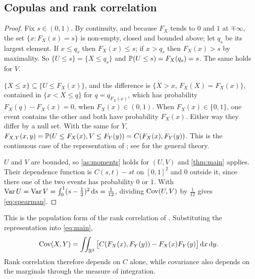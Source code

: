 \documentclass{saim-blog}
\begin{document}
\subsection{Copulas and rank correlation}
\begin{proof}
Fix $s\in(0,1)$. By continuity, and because $F_X$ tends to $0$ and $1$ at $\mp\infty$, the set $\{x:F_X(x)=s\}$ is non-empty, closed and bounded above; let $q_s$ be its largest element. If $x\le q_s$ then $F_X(x)\le s$; if $x>q_s$ then $F_X(x)>s$ by maximality. So $\{U\le s\}=\{X\le q_s\}$ and $\mathbb{P}(U\le s)=F_X(q_s)=s$. The same holds for $V$.

$\{X\le x\}\subseteq\{U\le F_X(x)\}$, and the difference is $\{X>x,\,F_X(X)=F_X(x)\}$, contained in $\{x<X\le q\}$ for $q=q_{F_X(x)}$, which has probability $F_X(q)-F_X(x)=0$, when $F_X(x)\in(0,1)$. When $F_X(x)\in\{0,1\}$, one event contains the other and both have probability $F_X(x)$. Either way they differ by a null set. With the same for $Y$, $F_{X,Y}(x,y)=\mathbb{P}(U\le F_X(x),V\le F_Y(y))=C(F_X(x),F_Y(y))$. This is the continuous case of the representation of \citet{sklar1959}; see \citet{nelsen2006} for the general theory.

$U$ and $V$ are bounded, so \cref{as:moments} holds for $(U,V)$ and \cref{thm:main} applies. Their dependence function is $C(s,t)-st$ on $[0,1]^2$ and $0$ outside it, since there one of the two events has probability $0$ or $1$. With $\operatorname{Var} U=\operatorname{Var} V=\int_0^1(s-\tfrac12)^2\mathop{}\!\mathrm{d} s=\tfrac1{12}$, dividing $\operatorname{Cov}(U,V)$ by $\tfrac1{12}$ gives \eqref{eq:spearman}.
\end{proof}
This is the population form of the rank correlation of \citet{spearman1904}. Substituting the representation into \eqref{eq:main},
\[
\operatorname{Cov}(X,Y)=\iint_{\mathbb{R}^2}\big[C(F_X(x),F_Y(y))-F_X(x)F_Y(y)\big]\mathop{}\!\mathrm{d} x\mathop{}\!\mathrm{d} y .
\]
Rank correlation therefore depends on $C$ alone, while covariance also depends on the marginals through the measure of integration.
\end{document}
